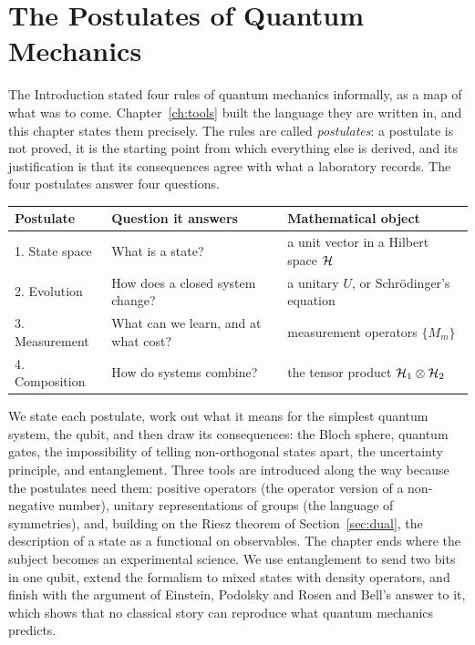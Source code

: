 \chapter{The Postulates of Quantum Mechanics}\label{ch:postulates}

The Introduction stated four rules of quantum mechanics informally, as a map of
what was to come. Chapter~\ref{ch:tools} built the language they are written
in, and this chapter states them precisely. The rules are called
\emph{postulates}: a postulate is not proved, it is the starting point from
which everything else is derived, and its justification is that its
consequences agree with what a laboratory records. The four postulates answer
four questions.

\begin{center}
\small
\begin{tabular}{@{}ll>{\raggedright\arraybackslash}p{}@{}}
  \toprule
  Postulate & Question it answers & Mathematical object\\
  \midrule
  1. State space & What is a state? & a unit vector in a Hilbert space $\mathcal{H}$\\
  2. Evolution & How does a closed system change? & a unitary $U$, or Schr\"odinger's equation\\
  3. Measurement & What can we learn, and at what cost? & measurement operators $\{M_m\}$\\
  4. Composition & How do systems combine? & the tensor product $\mathcal{H}_1\otimes\mathcal{H}_2$\\
  \bottomrule
\end{tabular}
\end{center}

We state each postulate, work out what it means for the simplest quantum
system, the qubit, and then draw its consequences: the Bloch sphere,
quantum gates, the impossibility of telling non-orthogonal states apart, the
uncertainty principle, and entanglement. Three tools are introduced along the way because the postulates need them: positive operators (the operator version of a non-negative number), unitary representations of groups (the language of symmetries), and, building on the Riesz theorem of Section~\ref{sec:dual}, the description of a state as a functional on observables. The chapter ends where the subject
becomes an experimental science. We use entanglement to send two bits in one
qubit, extend the formalism to mixed states with density operators, and finish
with the argument of Einstein, Podolsky and Rosen and Bell's answer to it,
which shows that no classical story can reproduce what quantum mechanics predicts.

